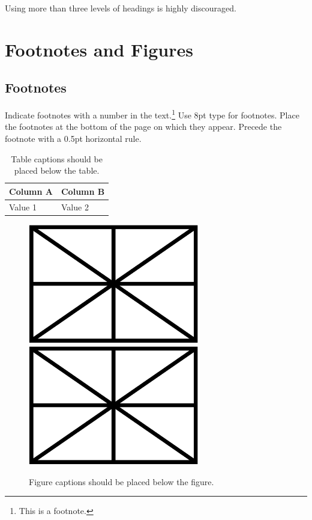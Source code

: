 \documentclass{article}
\begin{document}
Using more than three levels of headings is highly discouraged.

\section{Footnotes and Figures}

\subsection{Footnotes}

Indicate footnotes with a number in the text.\footnote{This is a footnote.} 
Use 8pt type for footnotes. Place the footnotes at the bottom of the page on which they appear. 
Precede the footnote with a 0.5pt horizontal rule.

\begin{table}[h]
 \begin{center}
 \begin{tabular}{|l|l|}
  \hline
  Column A & Column B \\
  \hline
  Value 1  & Value 2 \\
  \hline
 \end{tabular}
\end{center}
 \caption{Table captions should be placed below the table.}
 \label{tab:example}
\end{table}

\begin{figure}
 \centerline{\includegraphics[width=7.49cm]{figure.png}\hskip1.5cm\includegraphics[width=7.49cm]{figure.png}}
 \caption{Figure captions should be placed below the figure.}
 \label{fig:example}
\end{figure}
\end{document}
